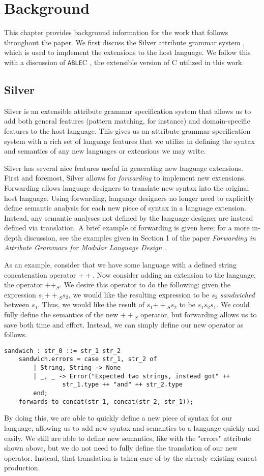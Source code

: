 \documentclass[main.tex]{subfiles}
\begin{document}
\section{Background}

This chapter provides background information for the work that follows
throughout the paper. We first discuss the Silver attribute grammar system 
\cite{3}, which is used to implement the extensions to the host language.
We follow this with a discussion of \verb|ABLE|C \cite{8}, the extensible
version of C utilized in this work.

\subsection{Silver} %
Silver \cite{3} is an extensible attribute grammar specification system that allows us to 
add both general features (pattern matching, for instance) and domain-specific features
to the host language. This gives us an attribute grammar specification system with a rich
set of language features that we utilize in defining the syntax and semantics of any new 
languages or extensions we may write.

Silver has several nice features useful in generating new language extensions.
First and foremost, Silver allows for \emph{forwarding} \cite{4} to 
implement new extensions. Forwarding allows language
designers to translate new syntax into the original host language. Using forwarding,
language designers no longer need to explicitly define semantic analysis for each new
piece of syntax in a language extension. Instead, any semantic analyses not defined
by the language designer are instead defined via translation. A brief example of forwarding is 
given here; for a more in-depth discussion, see the examples given in Section 1 of the paper 
\emph{Forwarding in Attribute Grammars for Modular Language Design} \cite{4}.

As an example, consider that we have some language with a defined string concatenation operator $++$.
Now consider adding an extension to the language, the operator $++_S$. We desire this operator to do
the following: given the expression $s_1 {++}_S s_2$, we would like the resulting expression to be $s_2$
\emph{sandwiched} between $s_1$. Thus, we would like the result of $s_1 {++}_S s_2$ to be $s_1 s_2 s_1$.
We could fully define the semantics of the new ${++}_S$ operator, but forwarding allows us to save both time and
effort. Instead, we can simply define our new operator as follows.
\begin{lstlisting}
sandwich : str_0 ::= str_1 str_2
	sandwich.errors = case str_1, str_2 of
		| String, String -> None
		| _, _ -> Error("Expected two strings, instead got" ++ 
				str_1.type ++ "and" ++ str_2.type
		end;
	forwards to concat(str_1, concat(str_2, str_1));
\end{lstlisting}
By doing this, we are able to quickly define a new piece of syntax for our language, allowing us to add new
syntax and semantics to a language quickly and easily. We still are able to define new semantics, like with the
"errors" attribute shown above, but we do not need to fully define the translation of our new operator. Instead,
that translation is taken care of by the already existing concat production.
\end{document}
